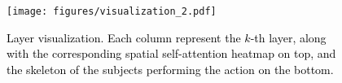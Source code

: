 \documentclass[times,twocolumn,final,authoryear]{elsarticle}
\DeclareRobustCommand{\new}[1]
{{\textcolor{black}{#1}}}
\begin{document}
 \begin{figure}[t]
    \centering
    \texttt{[image: figures/visualization\_2.pdf]}
    \caption{\new{Layer visualization. Each column represent the $k$-th layer, along with the corresponding spatial self-attention heatmap on top, and the skeleton of the subjects performing the action on the bottom.}}
    \label{fig:layers}
\end{figure}







\end{document}
